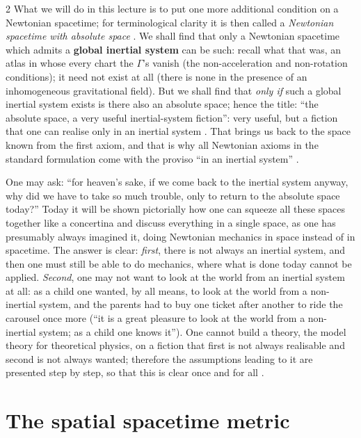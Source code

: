 \begin{paracol}{2}
What we will do in this lecture is to put one more additional condition on a Newtonian spacetime; for terminological clarity it is then called a \emph{Newtonian spacetime with absolute space} . We shall find that
only a Newtonian spacetime which admits a \textbf{global inertial system} can be such: recall what that was, an atlas in whose every chart the $\Gamma$'s vanish (the non-acceleration and non-rotation conditions); it need not exist at all (there is none in the
presence of an inhomogeneous gravitational field). But we shall find that \emph{only if} such a global inertial system exists is there also an absolute space; hence the title: ``the absolute space, a very useful inertial-system fiction'': very useful, but a fiction that
one can realise only in an inertial system . That brings us back to the space known from the first axiom, and that is why all Newtonian axioms in the standard formulation come with the proviso ``in an inertial system''
.

\begin{secondary}
One may ask: ``for heaven's sake, if we come back to the inertial system anyway, why did we have to take so much trouble, only to return to the absolute space today?'' Today it will be shown pictorially how one can squeeze all these spaces together
like a concertina and discuss everything in a single space, as one has presumably always imagined it, doing Newtonian mechanics in space instead of in spacetime. The answer is clear: \emph{first}, there is not always an inertial system, and then one must still be able to do
mechanics, where what is done today cannot be applied. \emph{Second}, one may not want to look at the world from an inertial system at all: as a child one wanted, by all means, to look at the world from a non-inertial system, and the parents had to buy one ticket after another to ride the carousel once more
(``it is a great pleasure to look at the world from a non-inertial system; as a child one knows it''). One cannot build a theory, the model theory for theoretical physics, on a fiction that first is not always realisable and second is not always wanted; therefore the assumptions leading to it are presented
step by step, so that this is clear once and for all .
\end{secondary}

\section{The spatial spacetime metric}\label{sec:as-metric}


\end{paracol}
